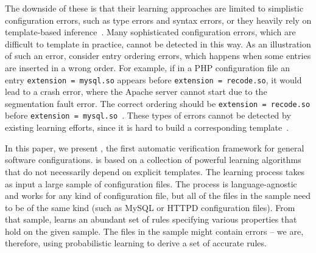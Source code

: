 The downside of these is that their learning approaches 
are limited to simplistic configuration errors, 
such as type errors and syntax errors, or they 
heavily rely on template-based inference~\cite{zhang14encore}. 
Many sophisticated configuration errors, 
which are difficult to template in practice, 
cannot be detected in this way. 
As an illustration of such an error, consider entry ordering errors, 
which happens when some entries are inserted in a wrong order. 
For example, if in a PHP configuration file 
an entry {\tt extension = mysql.so} appears 
before {\tt extension = recode.so},  
it would lead to a crash error, where the Apache server cannot start 
due to the segmentation fault error. The correct ordering 
should be {\tt extension = recode.so} before 
{\tt extension = mysql.so}~\cite{yin11anempirical}.
These types of errors cannot be detected by existing
learning efforts, 
since it is hard to build a corresponding template~\cite{xu15systems}. 



In this paper, we present \app, the first automatic verification framework
for general software configurations. 
\app is based on a collection of powerful learning 
algorithms that do not necessarily depend on explicit templates. 
The learning process takes as input a
 large sample of configuration files. The process is language-agnostic and works for any kind of configuration file, 
but all of the files in the sample need to be of the same kind (such as
MySQL or HTTPD configuration files).
From that sample,
\app learns an abundant set of rules specifying various properties that hold on the given sample. The files in the sample might contain
errors -- we are, therefore, using probabilistic learning to derive a set of accurate rules. 

